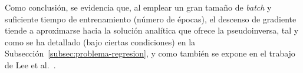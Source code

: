 Como conclusión, se evidencia que, al emplear un gran tamaño de \textit{batch} y suficiente tiempo de entrenamiento (número de épocas), el descenso de gradiente tiende a aproximarse hacia la solución analítica que ofrece la pseudoinversa, tal y como se ha detallado (bajo ciertas condiciones) en la Subsección~\ref{subsec:problema-regresion}, y como también se expone en el trabajo de Lee et al.~\cite{Lee2016}.

\endinput
